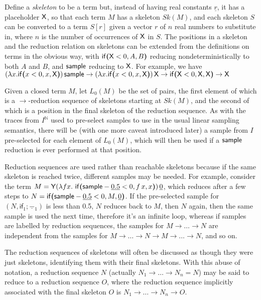Define a \emph{skeleton} to be a term but, instead of having real constants $\underline r$, it has a placeholder $\mathsf{X}$, so that each term $M$ has a skeleton $Sk(M)$, and each skeleton $S$ can be converted to a term $S[r]$ given a vector $r$ of $n$ real numbers to substitute in, where $n$ is the number of occurrences of $\mathsf{X}$ in $S$.  
The positions in a skeleton and the reduction relation on skeletons can be extended from the definitions on terms in the obvious way, with $\mathsf{if}\boldsymbol{(}\mathsf{X} < 0, A, B\boldsymbol{)}$ reducing nondeterministically to both $A$ and $B$, and $\mathsf{sample}$ reducing to $\mathsf{X}$.
For example, we have 
\(
(\lambda x . \mathsf{if}\boldsymbol{(}x < 0, x, \mathsf{X}\boldsymbol{)}) \, \mathsf{sample}
\to
(\lambda x . \mathsf{if}\boldsymbol{(}x < 0, x, \mathsf{X}\boldsymbol{)}) \, \mathsf{X}
\to
\mathsf{if}\boldsymbol{(}\mathsf{X} < 0, \mathsf{X}, \mathsf{X}\boldsymbol{)}
\to
\mathsf{X}
\)

Given a closed term $M$, let $L_0(M)$ be the set of pairs, the first element of which is a $\to$-reduction sequence of skeletons starting at $Sk(M)$, and the second of which is a position in the final skeleton of the reduction sequence. As with the traces from $I^{\mathbb N}$ used to pre-select samples to use in the usual linear sampling semantics, there will be (with one more caveat introduced later) a sample from $I$ pre-selected for each element of $L_0(M)$, which will then be used if a $\mathsf{sample}$ reduction is ever performed at that position.

Reduction sequences are used rather than reachable skeletons because if the same skeleton is reached twice, different samples may be needed. For example, consider the term $M = \mathsf{Y} (\lambda f x.\ \mathsf{if}\boldsymbol{(}\mathsf{sample} - \underline{0.5} < 0, f \, x, x\boldsymbol{)}) \, \underline 0$, which reduces after a few steps to $N = \mathsf{if}\boldsymbol{(}\mathsf{sample} - \underline{0.5}  < 0, M, \underline 0\boldsymbol{)}$. If the pre-selected sample for $(N,\textsf{if}_1;\underline{-}_1)$ is less than 0.5, $N$ reduces back to $M$, then $N$ again, then the same sample is used the next time, therefore it's an infinite loop, whereas if samples are labelled by reduction sequences, the samples for $M \to \dots \to N$ are independent from the samples for $M \to \dots \to N \to M \to \dots \to N$, and so on.

The reduction sequences of skeletons will often be discussed as though they were just skeletons, identifying them with their final skeletons. With this abuse of notation, a reduction sequence $N$ (actually $N_1 \to \dots \to N_n = N$) may be said to reduce to a reduction sequence $O$, where the reduction sequence implicitly associated with the final skeleton $O$ is $N_1 \to \dots \to N_n \to O$.

